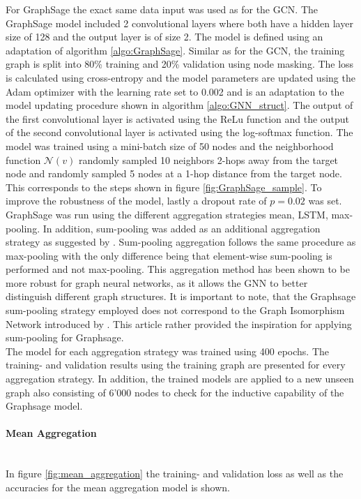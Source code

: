   For GraphSage the exact same data input was used as for the GCN. The 
  GraphSage model included 2 convolutional layers where both have a hidden 
  layer size of 128 and the output layer is of size 2. The model is defined
  using an adaptation of algorithm \ref{algo:GraphSage}. Similar as for the 
  GCN, the training graph is split into 80\% training and 20\% validation using 
  node masking. The loss is calculated using cross-entropy and the model 
  parameters are updated using the Adam optimizer with the learning rate set to 
  0.002 and is an adaptation to the model updating procedure shown in 
  algorithm \ref{algo:GNN_struct}. The output of the first convolutional layer 
  is activated using the ReLu function and the output of the second 
  convolutional layer is activated using the log-softmax function. The model was 
  trained using a mini-batch size of 50 nodes and the neighborhood function 
  $\mathcal{N}(v)$ randomly sampled 10 neighbors 2-hops away from the target
  node and randomly sampled 5 nodes at a 1-hop distance from the target node. 
  This corresponds to the steps shown in figure \ref{fig:GraphSage_sample}. 
  To improve the robustness of the model, lastly a dropout rate of $p = 0.02$ 
  was set. GraphSage was run using the different aggregation strategies mean, 
  LSTM, max-pooling. In addition, sum-pooling was added as an additional 
  aggregation strategy as suggested by \cite{xu2018powerful}. Sum-pooling 
  aggregation follows the same procedure as max-pooling with the only difference 
  being that element-wise sum-pooling is performed and not max-pooling. This 
  aggregation method has been shown to be more robust for graph neural networks, 
  as it allows the GNN to better distinguish different graph structures. It is
  important to note, that the Graphsage sum-pooling strategy employed does not
  correspond to the Graph Isomorphism Network introduced by 
  \cite{xu2018powerful}. This article rather provided the inspiration for
  applying sum-pooling for Graphsage. \\
  
  \noindent The model for each aggregation strategy was trained using 400 epochs. 
  The training- and validation results using the training graph are presented 
  for every aggregation strategy. In addition, the trained models are applied 
  to a new unseen graph also consisting of 6'000 nodes to check for the 
  inductive capability of the Graphsage model. 

  \paragraph{Mean Aggregation}  \mbox{}\\ 
  In figure \ref{fig:mean_aggregation} the training- and validation loss as
  well as the accuracies for the mean aggregation model is shown.

